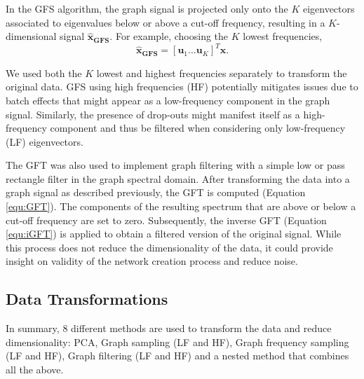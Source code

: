 \documentclass[10pt,conference,compsocconf]{IEEEtran}
\begin{document}
In the GFS algorithm, the graph signal is projected only onto the $K$ eigenvectors associated to eigenvalues below or above a cut-off frequency, resulting in a $K$-dimensional signal $\boldsymbol{\hat{x}_{GFS}}$. For example, choosing the $K$ lowest frequencies,
\begin{equation}
\boldsymbol{\hat{x}_{GFS}} = [ \boldsymbol{u}_1 ... \boldsymbol{u}_K]^T \boldsymbol{x}.
\end{equation} 
\par
We used both the $K$ lowest and highest frequencies separately to transform the original data. GFS using high frequencies (HF) potentially mitigates issues due to batch effects that might appear as a low-frequency component in the graph signal. Similarly, the presence of drop-outs might manifest itself as a high-frequency component and thus be filtered when considering only low-frequency (LF) eigenvectors.
\par
The GFT was also used to implement graph filtering with a simple low or pass rectangle filter in the graph spectral domain. After transforming the data into a graph signal as described previously, the GFT is computed (Equation \ref{equ:GFT}). The components of the resulting spectrum that are above or below a cut-off frequency are set to zero. Subsequently, the inverse GFT (Equation \ref{equ:iGFT}) is applied to obtain a filtered version of the original signal. While this process does not reduce the dimensionality of the data, it could provide insight on validity of the network creation process and reduce noise.
\par

\subsection{Data Transformations}
In summary, 8 different methods are used to transform the data and reduce dimensionality: PCA, Graph sampling (LF and HF), Graph frequency sampling (LF and HF), Graph filtering (LF and HF) and a nested method that combines all the above.
\end{document}
